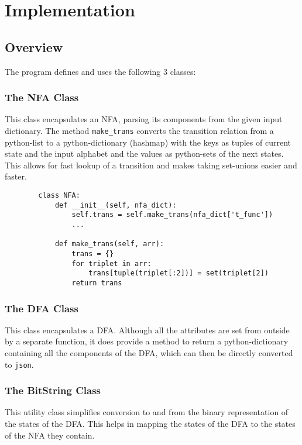 \documentclass[12pt]{scrreprt}
\begin{document}
    \chapter{Implementation}
    
    \section{Overview}
    
    The program defines and uses the following 3 classes:
    
    \subsection*{The NFA Class}
    This class encapsulates an NFA, parsing its components from the given input dictionary.
    The method \texttt{make_trans} converts the transition relation from a python-list to a python-dictionary (hashmap) with the keys as tuples of current state and the input alphabet and the values as python-sets of the next states. This allows for fast lookup of a transition and makes taking set-unions easier and faster.

    \begin{verbatim}
        class NFA:
            def __init__(self, nfa_dict):
                self.trans = self.make_trans(nfa_dict['t_func'])
                ...

            def make_trans(self, arr):
                trans = {}
                for triplet in arr:
                    trans[tuple(triplet[:2])] = set(triplet[2])
                return trans
    \end{verbatim}

    \subsection*{The DFA Class}
    This class encapsulates a DFA. Although all the attributes are set from outside by a separate function, it does provide a method to return a python-dictionary containing all the components of the DFA, which can then be directly converted to \texttt{json}.

    \subsection*{The BitString Class}
    This utility class simplifies conversion to and from the binary representation of the states of the DFA. This helps in mapping the states of the DFA to the states of the NFA they contain.
\end{document}
